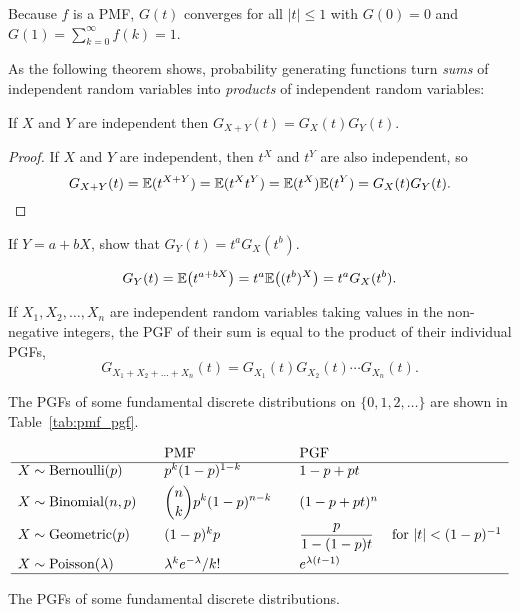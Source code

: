 \begin{remark}
Because $f$ is a PMF, $G(t)$ converges for all $|t|\leq 1$ with $G(0) = 0$ and $G(1)=\sum_{k=0}^{\infty} f(k) = 1$.
\end{remark}

As the following theorem shows, probability generating functions turn \emph{sums} of independent random variables into \emph{products} of independent random variables:
\begin{theorem}\label{thm:PGF_sum_of_independent}
If $X$ and $Y$ are independent then $G_{X+Y}(t) = G_X(t)G_Y(t)$.
\end{theorem}
\begin{proof}
If $X$ and $Y$ are independent, then $t^X$ and $t^Y$ are also independent, so 
\[
G_{X+Y}(t) = \mathbb{E}(t^{X+Y}) = \mathbb{E}(t^X t^Y) = \mathbb{E}(t^X)\mathbb{E}(t^Y) = G_X(t)G_Y(t).
\]
\end{proof}

\begin{exercise}
If $Y = a + bX$, show that $G_Y(t) = t^a G_X(t^b)$.
\begin{answer}
\[
G_Y(t) = \mathbb{E}\big(t^{a+bX}\big) = t^a \mathbb{E}\big((t^b)^X\big) = t^a G_X(t^b).
\]
\end{answer}
\end{exercise}

\begin{corollary}\label{cor:PGF_sum_of_independent}
If $X_1,X_2,\ldots,X_n$ are independent random variables taking values in the non-negative integers, the PGF of their sum is equal to the product of their individual PGFs,
\[
G_{X_1+X_2+\ldots+X_n}(t) = G_{X_1}(t)G_{X_2}(t)\cdots G_{X_n}(t).
\]
\end{corollary}

The PGFs of some fundamental discrete distributions on $\{0,1,2,\ldots\}$ are shown in Table~\ref{tab:pmf_pgf}.
\begin{table}[ht]
\[\begin{array}{lclcll}
								& & \text{PMF} 					& & \text{PGF}					& \\ \hline
X\sim\text{Bernoulli}(p)		& & p^k(1-p)^{1-k} 				& & 1 - p + pt			& \\[1ex]
X\sim\text{Binomial}(n,p)		& & \displaystyle\binom{n}{k}p^k(1-p)^{n-k} 	& & (1 - p + pt)^n		& \\[2ex]
X\sim\text{Geometric}(p)		& & (1-p)^{k}p 					& & \displaystyle\frac{p}{1-(1-p)t}	& \text{for $|t|<(1-p)^{-1}$}	\\[2ex]
X\sim\text{Poisson}(\lambda)	& & \lambda^k e^{-\lambda}/k! 	& & e^{\lambda(t-1)} \\ \hline
\end{array}\]
\caption{The PGFs of some fundamental discrete distributions.\label{tab:pmf_pgf}}
\end{table}

